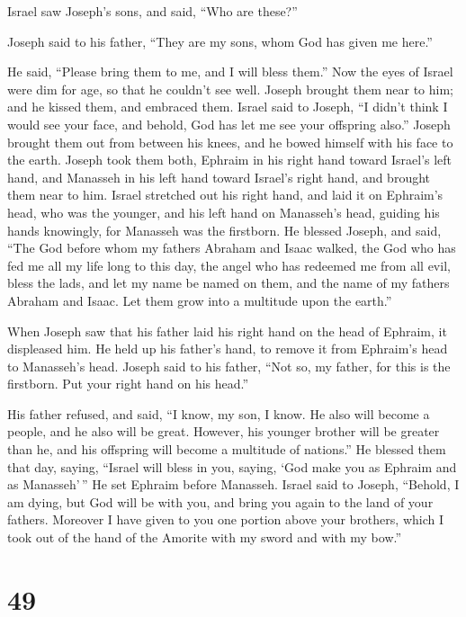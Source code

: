  Israel saw Joseph's sons, and said, ``Who are these?''

 Joseph said to his father, ``They are my sons, whom God
has given me here.''

He said, ``Please bring them to me, and I will bless them.''
 Now the eyes of Israel were dim for age, so that he
couldn't see well. Joseph brought them near to him; and he kissed them,
and embraced them.  Israel said to Joseph, ``I didn't
think I would see your face, and behold, God has let me see your
offspring also.''  Joseph brought them out from between
his knees, and he bowed himself with his face to the earth.
 Joseph took them both, Ephraim in his right hand toward
Israel's left hand, and Manasseh in his left hand toward Israel's right
hand, and brought them near to him.  Israel stretched out
his right hand, and laid it on Ephraim's head, who was the younger, and
his left hand on Manasseh's head, guiding his hands knowingly, for
Manasseh was the firstborn.  He blessed Joseph, and said,
``The God before whom my fathers Abraham and Isaac walked, the God who
has fed me all my life long to this day,  the angel who
has redeemed me from all evil, bless the lads, and let my name be named
on them, and the name of my fathers Abraham and Isaac. Let them grow
into a multitude upon the earth.''

 When Joseph saw that his father laid his right hand on
the head of Ephraim, it displeased him. He held up his father's hand, to
remove it from Ephraim's head to Manasseh's head.  Joseph
said to his father, ``Not so, my father, for this is the firstborn. Put
your right hand on his head.''

 His father refused, and said, ``I know, my son, I know.
He also will become a people, and he also will be great. However, his
younger brother will be greater than he, and his offspring will become a
multitude of nations.''  He blessed them that day,
saying, ``Israel will bless in you, saying, `God make you as Ephraim and
as Manasseh'\,'' He set Ephraim before Manasseh.  Israel
said to Joseph, ``Behold, I am dying, but God will be with you, and
bring you again to the land of your fathers.  Moreover I
have given to you one portion above your brothers, which I took out of
the hand of the Amorite with my sword and with my bow.''

\hypertarget{section-48}{%
\section{49}\label{section-48}}

